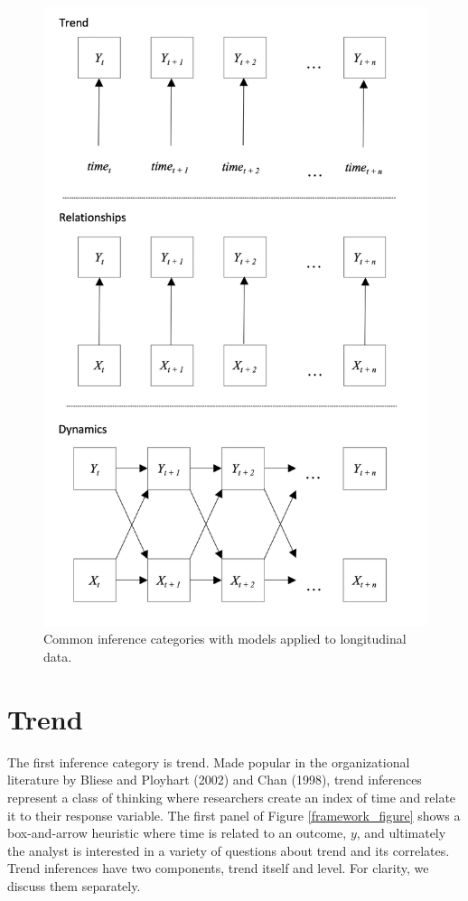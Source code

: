 \documentclass[english,,man]{apa6}
\theoremstyle{definition}
\theoremstyle{definition}
\theoremstyle{definition}
\theoremstyle{remark}
\begin{document}
\begin{figure}

{\centering \includegraphics[width=4.66in]{figures/dynamics/framework} 

}

\caption{Common inference categories with models applied to longitudinal data.\label{framework_figure}}\label{fig:unnamed-chunk-6}
\end{figure}

\hypertarget{trend}{%
\section{Trend}\label{trend}}

The first inference category is trend. Made popular in the
organizational literature by Bliese and Ployhart (2002) and Chan (1998),
trend inferences represent a class of thinking where researchers create
an index of time and relate it to their response variable. The first
panel of Figure \ref{framework_figure} shows a box-and-arrow heuristic
where time is related to an outcome, \(y\), and ultimately the analyst
is interested in a variety of questions about trend and its correlates.
Trend inferences have two components, trend itself and level. For
clarity, we discuss them separately.
\end{document}
